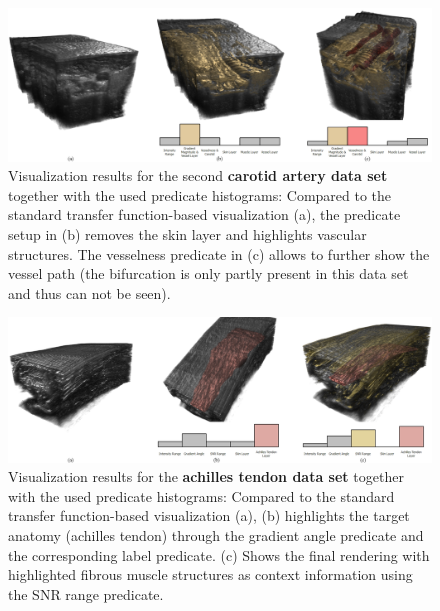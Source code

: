 \begin{figure}[ht]
	\centering
	\includegraphics[width=0.95\linewidth]{figures/predicates/carotid2.jpg}
	\caption{
		Visualization results for the second \textbf{carotid artery data set} together with the used predicate histograms: 
		Compared to the standard transfer function-based visualization (a), the predicate setup in (b) removes the skin layer and highlights vascular structures. 
		The vesselness predicate in (c) allows to further show the vessel path (the bifurcation is only partly present in this data set and thus can not be seen).
	}
	\label{fig:predicates:results-carotid2}
\end{figure}
\begin{figure}[ht]
	\centering
	\includegraphics[width=0.95\linewidth]{figures/predicates/achilles.jpg}
	\caption{
		Visualization results for the \textbf{achilles tendon data set} together with the used predicate histograms: 
		Compared to the standard transfer function-based visualization (a), (b) highlights the target anatomy (achilles tendon) through the gradient angle predicate and the corresponding label predicate. 
		(c) Shows the final rendering with highlighted fibrous muscle structures as context information using the SNR range predicate.
	}
	\label{fig:predicates:results-achilles}
\end{figure}

